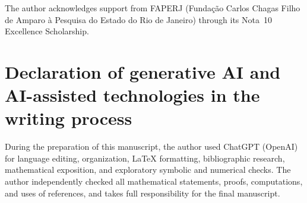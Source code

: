 \documentclass[11pt]{article}
\theoremstyle{plain}
\theoremstyle{definition}
\theoremstyle{remark}
\newcommand{\1}{\mathbf 1}
\begin{document}
The author acknowledges support from FAPERJ (Funda\c{c}\~ao Carlos Chagas Filho de Amparo \`a Pesquisa do Estado do Rio de Janeiro) through its Nota~10 Excellence Scholarship.

\section*{Declaration of generative AI and AI-assisted technologies in the writing process}

During the preparation of this manuscript, the author used ChatGPT (OpenAI) for language editing, organization, \LaTeX{} formatting, bibliographic research, mathematical exposition, and exploratory symbolic and numerical checks.  The author independently checked all mathematical statements, proofs, computations, and uses of references, and takes full responsibility for the final manuscript.

\printbibliography
\end{document}
